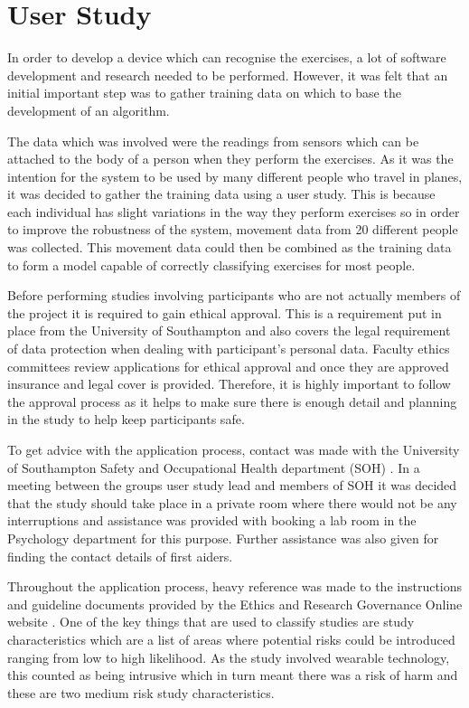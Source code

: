 \chapter{User Study}\label{chap:study}
In order to develop a device which can recognise the exercises, a lot of software development and research needed to be performed. However, it was felt that an initial important step was to gather training data on which to base the development of an algorithm.

The data which was involved were the readings from sensors which can be attached to the body of a person when they perform the exercises. As it was the intention for the system to be used by many different people who travel in planes, it was decided to gather the training data using a user study. This is because each individual has slight variations in the way they perform exercises so in order to improve the robustness of the system, movement data from 20 different people was collected. This movement data could then be combined as the training data to form a model capable of correctly classifying exercises for most people.

Before performing studies involving participants who are not actually members of the project it is required to gain ethical approval. This is a requirement put in place from the University of Southampton and also covers the legal requirement of data protection when dealing with participant's personal data. Faculty ethics committees review applications for ethical approval and once they are approved insurance and legal cover is provided. Therefore, it is highly important to follow the approval process as it helps to make sure there is enough detail and planning in the study to help keep participants safe.

To get advice with the application process, contact was made with the University of Southampton Safety and Occupational Health department (SOH) \cite{sotonsoh}. In a meeting between the groups user study lead and members of SOH it was decided that the study should take place in a private room where there would not be any interruptions and assistance was provided with booking a lab room in the Psychology department for this purpose. Further assistance was also given for finding the contact details of first aiders.

Throughout the application process, heavy reference was made to the instructions and guideline documents provided by the Ethics and Research Governance Online website \cite{ergo}. One of the key things that are used to classify studies are study characteristics which are a list of areas where potential risks could be introduced ranging from low to high likelihood. As the study involved wearable technology, this counted as being intrusive which in turn meant there was a risk of harm and these are two medium risk study characteristics.

